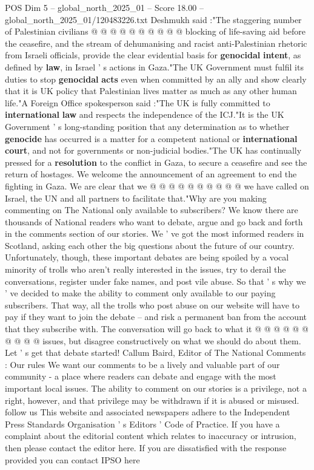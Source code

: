 \begin{textsample}{POS Dim 5 – global\_north\_2025\_01 – Score 18.00 – global\_north\_2025\_01/120483226.txt}
Deshmukh said :"The staggering number of Palestinian civilians @ @ @ @ @ @ @ @ @ @ blocking of life-saving aid before the ceasefire, and the stream of dehumanising and racist anti-Palestinian rhetoric from Israeli officials, provide the clear evidential basis for \textbf{genocidal} \textbf{intent}, as defined by \textbf{law}, in Israel ' s actions in Gaza."The UK Government must fulfil its duties to stop \textbf{genocidal} \textbf{acts} even when committed by an ally and show clearly that it is UK policy that Palestinian lives matter as much as any other human life."A Foreign Office spokesperson said :"The UK is fully committed to \textbf{international} \textbf{law} and respects the independence of the ICJ."It is the UK Government ' s long-standing position that any determination as to whether \textbf{genocide} has occurred is a matter for a competent national or \textbf{international} \textbf{court}, and not for governments or non-judicial bodies."The UK has continually pressed for a \textbf{resolution} to the conflict in Gaza, to secure a ceasefire and see the return of hostages.
We welcome the announcement of an agreement to end the fighting in Gaza.
We are clear that we @ @ @ @ @ @ @ @ @ @ we have called on Israel, the UN and all partners to facilitate that."Why are you making commenting on The National only available to subscribers?
We know there are thousands of National readers who want to debate, argue and go back and forth in the comments section of our stories.
We ' ve got the most informed readers in Scotland, asking each other the big questions about the future of our country.
Unfortunately, though, these important debates are being spoiled by a vocal minority of trolls who aren't really interested in the issues, try to derail the conversations, register under fake names, and post vile abuse.
So that ' s why we ' ve decided to make the ability to comment only available to our paying subscribers.
That way, all the trolls who post abuse on our website will have to pay if they want to join the debate -- and risk a permanent ban from the account that they subscribe with.
The conversation will go back to what it @ @ @ @ @ @ @ @ @ @ issues, but disagree constructively on what we should do about them.
Let ' s get that debate started!
Callum Baird, Editor of The National Comments : Our rules We want our comments to be a lively and valuable part of our community - a place where readers can debate and engage with the most important local issues.
The ability to comment on our stories is a privilege, not a right, however, and that privilege may be withdrawn if it is abused or misused. follow us This website and associated newspapers adhere to the Independent Press Standards Organisation ' s Editors ' Code of Practice.
If you have a complaint about the editorial content which relates to inaccuracy or intrusion, then please contact the editor here.
If you are dissatisfied with the response provided you can contact IPSO here

\end{textsample}
